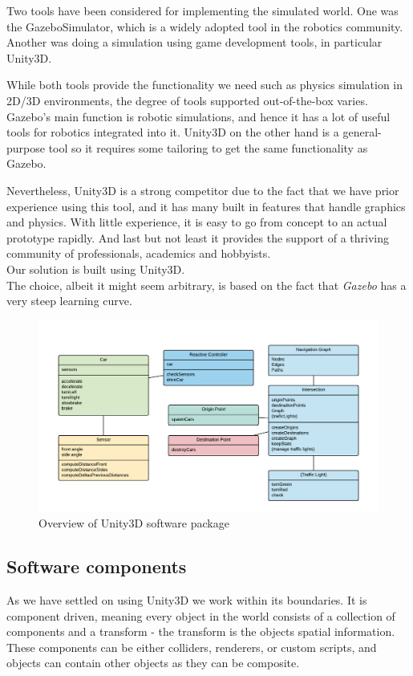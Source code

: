 Two tools have been considered for implementing the simulated world. One was the GazeboSimulator, which is a widely adopted tool in the robotics community.
Another was doing a simulation using game development tools, in particular Unity3D.

While both tools provide the functionality we need such as physics simulation in 2D/3D  environments, the degree of tools supported out-of-the-box varies.
Gazebo's main function is robotic simulations, and hence it has a lot of useful tools for robotics integrated into it.
Unity3D on the other hand is a general-purpose tool so it requires some tailoring to get the same functionality as Gazebo.

Nevertheless, Unity3D is a strong competitor due to the fact that we have prior experience using this tool, and it has many built in features that handle graphics and physics. 
With little experience, it is easy to go from concept to an actual prototype rapidly.
And last but not least it provides the support of a thriving community of professionals, academics and hobbyists.\\
Our solution is built using Unity3D.\\

The choice, albeit it might seem arbitrary, is based on the fact that \textit{Gazebo} has a very steep learning curve.

\begin{figure}
\centering
\includegraphics[scale=.6]{img/classdiagram}
\caption{Overview of Unity3D software package}
\label{figure:classdiagram}
\end{figure}

\subsection{Software components}
As we have settled on using Unity3D we work within its boundaries.
It is component driven, meaning every object in the world consists of a collection of components and a transform - the transform is the objects spatial information.
These components can be either colliders, renderers, or custom scripts, and objects can contain other objects as they can be composite.

